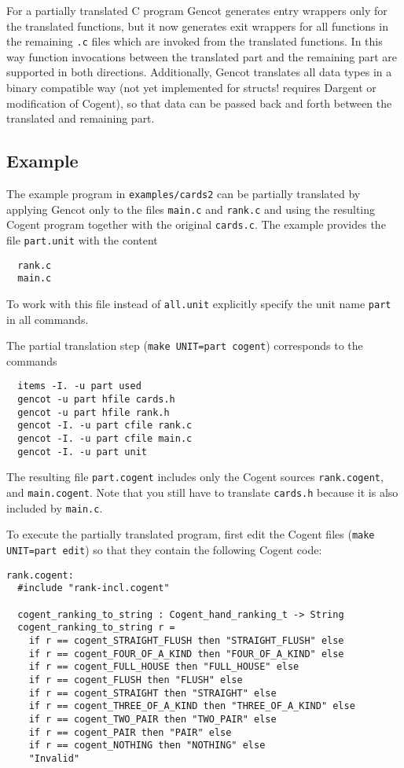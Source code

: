 \documentclass[a4paper]{report}
\newcommand{\code}[1]{\textnormal{\texttt{#1}}}
\begin{document}
For a partially translated C program Gencot generates entry wrappers only for the translated functions, but it now
generates exit wrappers for all functions in the remaining \code{.c} files which are invoked from the translated functions.
In this way function invocations between the translated part and the remaining part are supported in both directions.
Additionally, Gencot translates all data types in a binary compatible way (not yet implemented for structs! requires Dargent 
or modification of Cogent), so that data can be passed back and forth between the translated and remaining part.

\subsection{Example}

The example program in \code{examples/cards2} can be partially translated by applying Gencot only to the files \code{main.c}
and \code{rank.c} and using the resulting Cogent program together with the original \code{cards.c}. The example provides
the file \code{part.unit} with the content
\begin{verbatim}
  rank.c
  main.c
\end{verbatim}
To work with this file instead of \code{all.unit} explicitly specify the unit name \code{part} in all commands.

The partial translation step (\code{make UNIT=part cogent}) corresponds to the commands
\begin{verbatim}
  items -I. -u part used
  gencot -u part hfile cards.h
  gencot -u part hfile rank.h
  gencot -I. -u part cfile rank.c
  gencot -I. -u part cfile main.c
  gencot -I. -u part unit
\end{verbatim}
The resulting file \code{part.cogent} includes only the Cogent sources \code{rank.cogent}, and
\code{main.cogent}. Note that you still have to translate \code{cards.h} because it is also included by \code{main.c}.

To execute the partially translated program, first edit the Cogent files (\code{make UNIT=part edit}) so that they contain
the following Cogent code:
\begin{verbatim}
rank.cogent:
  #include "rank-incl.cogent"

  cogent_ranking_to_string : Cogent_hand_ranking_t -> String
  cogent_ranking_to_string r =
    if r == cogent_STRAIGHT_FLUSH then "STRAIGHT_FLUSH" else
    if r == cogent_FOUR_OF_A_KIND then "FOUR_OF_A_KIND" else
    if r == cogent_FULL_HOUSE then "FULL_HOUSE" else
    if r == cogent_FLUSH then "FLUSH" else
    if r == cogent_STRAIGHT then "STRAIGHT" else
    if r == cogent_THREE_OF_A_KIND then "THREE_OF_A_KIND" else
    if r == cogent_TWO_PAIR then "TWO_PAIR" else
    if r == cogent_PAIR then "PAIR" else
    if r == cogent_NOTHING then "NOTHING" else
    "Invalid"
\end{verbatim}
\end{document}
